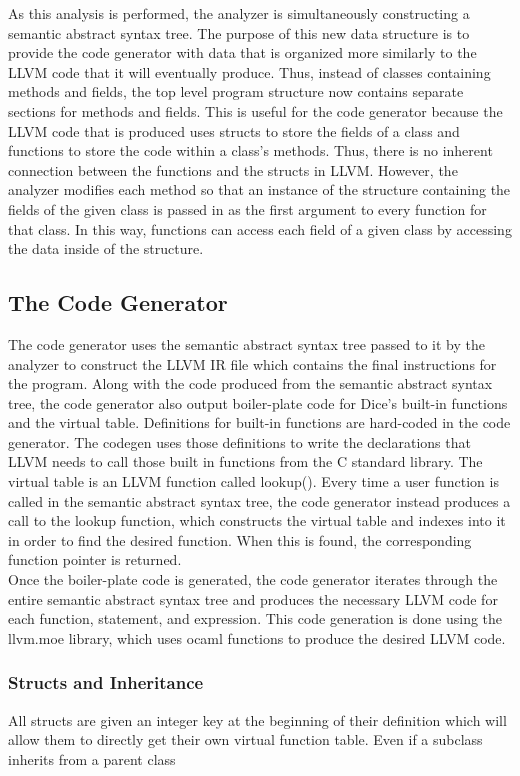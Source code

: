 \begin{homeworkProblem}
	As this analysis is performed, the analyzer is simultaneously constructing a semantic abstract syntax tree. The purpose of this new data structure is to provide the code generator with data that is organized more similarly to the LLVM code that it will eventually produce. Thus, instead of classes containing methods and fields, the top level program structure now contains separate sections for methods and fields. This is useful for the code generator because the LLVM code that is produced uses structs to store the fields of a class and functions to store the code within a class's methods. Thus, there is no inherent connection between the functions and the structs in LLVM. However, the analyzer modifies each method so that an instance of the structure containing the fields of the given class is passed in as the first argument to every function for that class. In this way, functions can access each field of a given class by accessing the data inside of the structure. 
	
	\subsection{The Code Generator}
    
    The code generator uses the semantic abstract syntax tree passed to it by the analyzer to construct the LLVM IR file which contains the final instructions for the program. Along with the code produced from the semantic abstract syntax tree, the code generator also output boiler-plate code for Dice's built-in functions and the virtual table. Definitions for built-in functions are hard-coded in the code generator. The codegen uses those definitions to write the declarations that LLVM needs to call those built in functions from the C standard library. The virtual table is an LLVM function called lookup(). Every time a user function is called in the semantic abstract syntax tree, the code generator instead produces a call to the lookup function, which constructs the virtual table and indexes into it in order to find the desired function. When this is found, the corresponding function pointer is returned. \\
    
    Once the boiler-plate code is generated, the code generator iterates through the entire semantic abstract syntax tree and produces the necessary LLVM code for each function, statement, and expression. This code generation is done using the llvm.moe library, which uses ocaml functions to produce the desired LLVM code. 
    \subsubsection{Structs and Inheritance}
    All structs are given an integer key at the beginning of their definition which will allow them to directly get their own virtual function table. Even if a subclass inherits from a parent class

\end{homeworkProblem}
